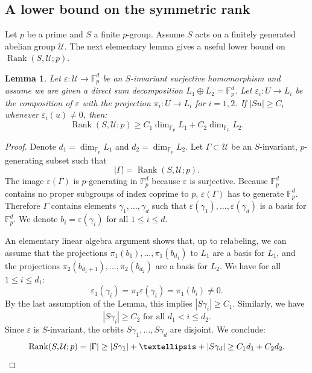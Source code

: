 \documentclass[12pt]{amsart}
\numberwithin{equation}{section}
\newtheorem{lemma}[theorem]{Lemma}
\theoremstyle{definition}
\newcommand{\cU}{\mathcal{U}}
\newcommand{\bF}{\mathbb{F}}
\newcommand{\SymRank}{\operatorname{Rank}}
\newcommand{\eps}{\varepsilon}
\begin{document}
\subsection{A lower bound on the symmetric rank}
Let $p$ be a prime and $S$  a finite $p$-group. Assume $S$ acts on a finitely generated abelian group $\cU$. The next elementary lemma gives a useful lower bound on $\SymRank(S,\cU;p)$.


\begin{lemma}\label{lem.symrank_fancy}
    Let $\eps: \cU \to \bF_p^{d}$ be an $S$-invariant surjective homomorphism and assume we are given a direct sum decomposition $L_1\oplus L_2 = \bF_p^d$. Let $\eps_i : U\to L_i$ be the composition of $\eps$ with the projection $\pi_i: U \to L_i$ for $i=1,2$.
     If $|S u|\geq C_i$ whenever $\eps_i(u)\neq 0$, then:
    $$\SymRank(S,\cU;p) \geq C_1 \dim_{\bF_p} L_1 + C_2 \dim_{\bF_p} L_2.$$
\end{lemma}
\begin{proof}
Denote $d_1 = \dim_{\bF_p} L_1$ and $d_2 = \dim_{\bF_p} L_2$.
Let $\Gamma\subset \cU$ be an $S$-invariant, $p$-generating subset such that 
$$|\Gamma| = \SymRank(S,\cU;p).$$
The image $\eps(\Gamma)$ is $p$-generating in $\bF_p^d$ because $\eps$ is surjective. Because $\bF_p^d$ contains no proper subgroups of index coprime to $p$,  $\eps(\Gamma)$ has to generate $\bF_p^d$. Therefore $\Gamma$ contains elements $\gamma_1,\dots,\gamma_d$ such that $\eps(\gamma_1),\dots,\eps(\gamma_d)$ is a basis for $\bF_p^d$. We denote $b_i = \eps(\gamma_i)$ for all $1\leq i\leq d$.

An elementary linear algebra argument shows that, up to relabeling, we can assume that the projections $\pi_1(b_1),\dots,\pi_1(b_{d_1})$ to $L_1$ are a basis for $L_1$, and the projections $\pi_2(b_{d_1+1}),\dots,\pi_2(b_{d_2})$ are a basis for $L_2$. We have for all $1\leq i\leq d_1$:
$$\eps_1(\gamma_i)= \pi_1\eps(\gamma_i) = \pi_1(b_i)  \neq 0.$$
By the last assumption of the Lemma, this implies $|S \gamma_i| \geq C_1$.
Similarly, we have
$$|S \gamma_i| \geq C_2 \text{ for all }d_1 < i\leq d_2.$$
Since $\eps$ is $S$-invariant, the orbits $S\gamma_1,\dots, S\gamma_d$ are disjoint. We conclude:
\[\SymRank(S,\cU;p) = |\Gamma|  \geq |S\gamma_1|+\dots+|S\gamma_d| \geq C_1 d_1+C_2 d_2. \qedhere \]
\end{proof}
\end{document}

